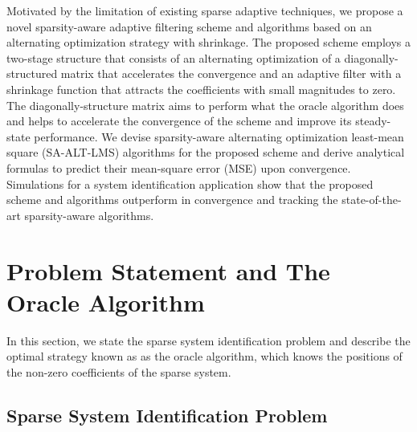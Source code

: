\documentclass[10pt,onecolumn]{IEEEtran}
\begin{document}
Motivated by the limitation of existing sparse adaptive techniques,
we propose a novel sparsity-aware adaptive filtering scheme and
algorithms based on an alternating optimization strategy with
shrinkage. The proposed scheme employs a two-stage structure that
consists of an alternating optimization of a diagonally-structured
matrix that accelerates the convergence and an adaptive filter with
a shrinkage function that attracts the coefficients with small
magnitudes to zero. The diagonally-structure matrix aims to perform
what the oracle algorithm does and helps to accelerate the
convergence of the scheme and improve its steady-state performance.
We devise sparsity-aware alternating optimization least-mean square
(SA-ALT-LMS) algorithms for the proposed scheme and derive
analytical formulas to predict their mean-square error (MSE) upon
convergence. Simulations for a system identification application
show that the proposed scheme and algorithms outperform in
convergence and tracking the state-of-the-art sparsity-aware
algorithms.

\section{Problem Statement and The Oracle Algorithm}

In this section, we state the sparse system identification problem
and describe the optimal strategy known as as the oracle algorithm,
which knows the positions of the non-zero coefficients of the sparse
system.

\subsection{Sparse System Identification Problem}
\end{document}
